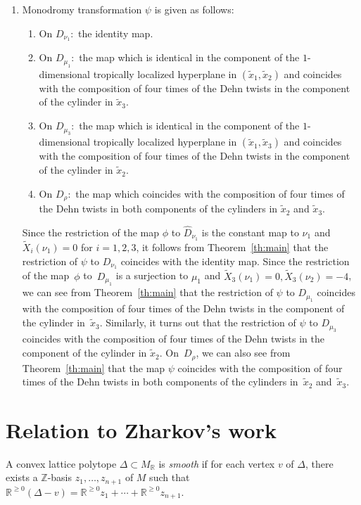 \documentclass[pdftex]{sigma}
\numberwithin{equation}{section}
\begin{document}
\begin{enumerate}
\item Monodromy transformation $\psi$ is given as follows:
 \begin{enumerate}\itemsep=0pt
 \item On $D_{\nu_1} \colon$ the identity map.
 \item On $D_{\mu_1} \colon$ the map which is identical in the component of the $1$-dimensional tropically localized hyperplane in $(\tilde{x}_1, \tilde{x}_2)$ and coincides with the composition of four times of the Dehn twists in the component of the cylinder in $\tilde{x}_3$.
 \item On $D_{\mu_3} \colon$ the map which is identical in the component of the $1$-dimensional tropically localized hyperplane in $(\tilde{x}_1, \tilde{x}_3)$ and coincides with the composition of four times of the Dehn twists in the component of the cylinder in $\tilde{x}_2$.
 \item On $D_{\rho} \colon$ the map which coincides with the composition of four times of the Dehn twists in both components of the cylinders in $\tilde{x}_2$ and $\tilde{x}_3$.
 \end{enumerate}
 Since the restriction of the map $\phi$ to $\widehat{D}_{\nu_1}$ is the constant map to $\nu_1$ and $\widetilde{X}_i(\nu_1)=0$ for $i=1,2,3$, it follows from Theorem~\ref{th:main} that the restriction of $\psi$ to $D_{\nu_1}$ coincides with the identity map. Since the restriction of the map~$\phi$ to~$D_{\mu_1}$ is a surjection to $\mu_1$ and $\widetilde{X}_3(\nu_1)=0, \widetilde{X}_3(\nu_2)=-4$, we can see from Theorem~\ref{th:main} that the restriction of $\psi$ to $D_{\mu_1}$ coincides with the composition of four times of the Dehn twists in the component of the cylinder in~$\tilde{x}_3$.
 Similarly, it turns out that the restriction of $\psi$ to $D_{\mu_3}$ coincides with the composition of four times of the Dehn twists in the component of the cylinder in $\tilde{x}_2$. On~$D_\rho$, we can also see from Theorem~\ref{th:main} that the map $\psi$ coincides with the composition of four times of the Dehn twists in both components of the cylinders in~$\tilde{x}_2$ and~$\tilde{x}_3$.
\end{enumerate}

\section{Relation to Zharkov's work}\label{sc:7}

\begin{Definition}
A convex lattice polytope $\Delta \subset M_{\mathbb R}$ is {\it smooth} if for each vertex $v$ of $\Delta$, there exists a ${\mathbb Z}$-basis $z_1, \dots, z_{n+1}$ of $M$ such that ${\mathbb R}^{\geq0}(\Delta-v)={\mathbb R}^{\geq 0}z_1+ \cdots +{\mathbb R}^{\geq 0}z_{n+1}$.
\end{Definition}
\end{document}
